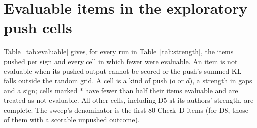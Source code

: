 \documentclass[11pt]{article}
\begin{document}
\section{Evaluable items in the exploratory push cells}\label{app:evaluable}
Table~\ref{tab:evaluable} gives, for every run in Table~\ref{tab:strength}, the items pushed per sign and every cell in which fewer were evaluable. An item is not evaluable when its pushed output cannot be scored or the push's summed KL falls outside the random grid. A cell is a kind of push ($o$ or $d$), a strength in gaps and a sign; cells marked $\ast$ have fewer than half their items evaluable and are treated as not evaluable. All other cells, including D5 at its authors' strength, are complete. The sweep's denominator is the first 80 Check~D items (for D8, those of them with a scorable unpushed outcome).
\end{document}
